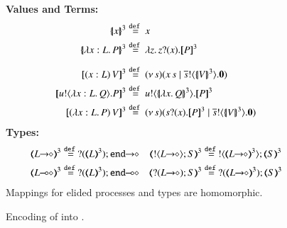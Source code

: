 
\begin{figure}[t]
	{\bf Values and Terms:}
	\begin{align*}
	\auxmap{x}{3} & \defeq  x
	\\
	\auxmap{\abs{x: L}{P}}{3} & \defeq  \abs{z}{\binp{z}{x} \pmap{P}{3}}
	\\[2mm]
	\pmap{\appl{(x:L)}{V}}{3} & \defeq \newsp{s}{\appl{x}{s} \Par \bout{\dual{s}}{\auxmap{V}{3}} \inact}
	\\
	\pmap{\bout{u}{\abs{x: L}{Q}} P}{3} & \defeq \bout{u}{\auxmap{\abs{x}{Q}}{3} } \pmap{P}{3}
	\\
	\pmap{\appl{(\abs{x: L}{P})}{V}}{3} & \defeq \newsp{s}{\binp{s}{x} \pmap{P}{3} \Par  \bout{\dual{s}}{\auxmap{V}{3}} \inact}
	\end{align*}
{\bf Types:}
\begin{align*}
	 \tmap{\shot{L}}{3} & \defeq \shot{\btinp{\tmap{L}{3}} \tinact}
	&
	\tmap{\btout{\shot{L}} S}{3} & \defeq \btout{\tmap{\shot{L}}{3}} \tmap{S}{3}
	\\
	\tmap{\lhot{L}}{3} & \defeq \lhot{\btinp{\tmap{L}{3}} \tinact}
	&
	 \tmap{\btinp{\shot{L}} S}{3} & \defeq \btinp{\tmap{\shot{L}}{3}} \tmap{S}{3}
\end{align*}
Mappings for elided processes and types are homomorphic.
\caption{\label{f:enc:hopip_to_hopi} Encoding of \HOpp into \HOp.}
\end{figure} 
